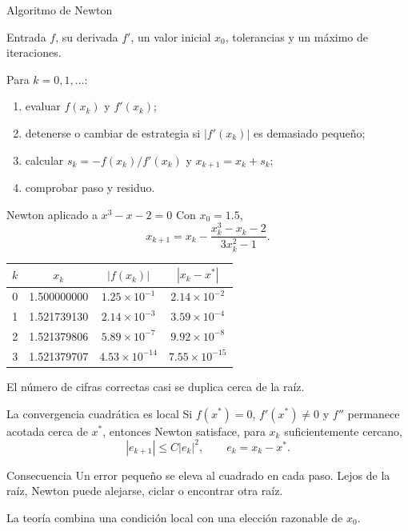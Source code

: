 \documentclass[aspectratio=169,12pt]{beamer}
\begin{document}
\begin{frame}{Algoritmo de Newton}
\begin{block}{Entrada}
$f$, su derivada $f'$, un valor inicial $x_0$, tolerancias y un máximo de iteraciones.
\end{block}
Para $k=0,1,\ldots$:
\begin{enumerate}
  \item evaluar $f(x_k)$ y $f'(x_k)$;
  \item detenerse o cambiar de estrategia si $|f'(x_k)|$ es demasiado pequeño;
  \item calcular $s_k=-f(x_k)/f'(x_k)$ y $x_{k+1}=x_k+s_k$;
  \item comprobar paso y residuo.
\end{enumerate}
\end{frame}

\begin{frame}{Newton aplicado a $x^3-x-2=0$}
Con $x_0=1.5$,
\[
x_{k+1}=x_k-\frac{x_k^3-x_k-2}{3x_k^2-1}.
\]
\centering
\begin{tabular}{cccc}
\toprule
$k$ & $x_k$ & $|f(x_k)|$ & $|x_k-x^*|$ \\
\midrule
0 & 1.500000000 & $1.25\times10^{-1}$ & $2.14\times10^{-2}$ \\
1 & 1.521739130 & $2.14\times10^{-3}$ & $3.59\times10^{-4}$ \\
2 & 1.521379806 & $5.89\times10^{-7}$ & $9.92\times10^{-8}$ \\
3 & 1.521379707 & $4.53\times10^{-14}$ & $7.55\times10^{-15}$ \\
\bottomrule
\end{tabular}

El número de cifras correctas casi se duplica cerca de la raíz.
\end{frame}

\begin{frame}{La convergencia cuadrática es local}
Si $f(x^*)=0$, $f'(x^*)\neq0$ y $f''$ permanece acotada cerca de $x^*$, entonces
Newton satisface, para $x_k$ suficientemente cercano,
\[
|e_{k+1}|\leq C|e_k|^2,
\qquad e_k=x_k-x^*.
\]
\begin{block}{Consecuencia}
Un error pequeño se eleva al cuadrado en cada paso. Lejos de la raíz, Newton
puede alejarse, ciclar o encontrar otra raíz.
\end{block}
La teoría combina una condición local con una elección razonable de $x_0$.
\end{frame}
\end{document}
